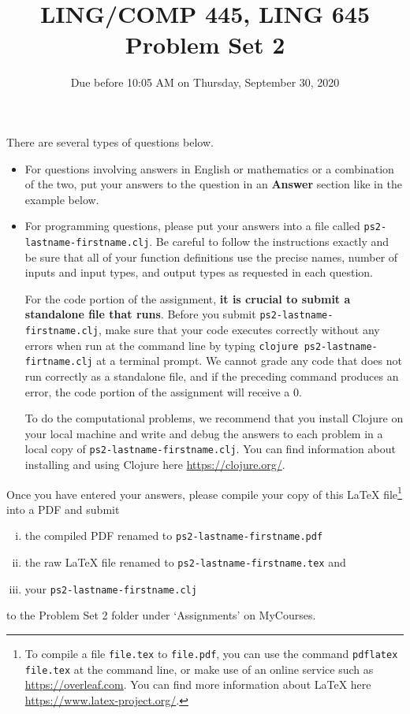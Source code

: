 \documentclass[10pt]{article}
\author{}
\newcommand{\PSnum}{2}
\begin{document}
 
\title{LING/COMP 445, LING 645\\Problem Set \PSnum}
\date{Due before 10:05 AM on Thursday, September 30, 2020}
\maketitle
There are several types of questions below. 
\begin{itemize}
\item
For questions involving answers in English or mathematics or a
combination of the two, put your answers to the question in an
\textbf{Answer} section like in the example below. 

\item For programming questions,
please put your answers into a file called
\texttt{ps\PSnum-lastname-firstname.clj}. Be careful to follow the instructions
exactly and be sure that all of your function definitions use the
precise names, number of inputs and input types, and output types as
requested in each question.

For the code portion of the assignment, \textbf{it is crucial to submit a
standalone file that runs}. Before you submit \texttt{ps\PSnum-lastname-firstname.clj}, 
make sure that your code executes correctly without any errors 
when run at the command line by typing 
\texttt{clojure ps\PSnum-lastname-firtname.clj} at a terminal
prompt. We cannot grade any code that does not run correctly as a
standalone file, and if the preceding command produces an error,
the code portion of the assignment will receive a $0$.

To do the computational problems, we recommend that you install
Clojure on your local machine and write and debug the answers to each
problem in a local copy of \texttt{ps\PSnum-lastname-firstname.clj}. You can
find information about installing and using Clojure here
\url{https://clojure.org/}.
\end{itemize}
Once you have entered your answers, please compile your copy of this
\LaTeX{} file\footnote{To compile a file \texttt{file.tex} to
\texttt{file.pdf}, you can use the command \texttt{pdflatex file.tex} at the command line, or make use of an online service such as
\url{https://overleaf.com}. You can find more information about
\LaTeX{} here \url{https://www.latex-project.org/}.}
into a PDF and submit 
\begin{enumerate}[(i),noitemsep]
\item
the compiled PDF renamed to
\texttt{ps\PSnum-lastname-firstname.pdf} 
\item
the raw \LaTeX{} file renamed to
\texttt{ps\PSnum-lastname-firstname.tex} and 
\item
your \texttt{ps\PSnum-lastname-firstname.clj}
\end{enumerate}
to the Problem Set \PSnum{} folder under `Assignments' on MyCourses.
\end{document}
